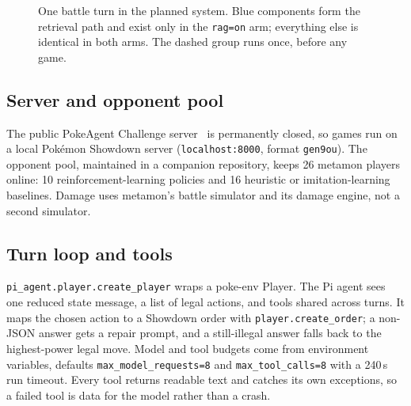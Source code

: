 \documentclass[11pt,a4paper]{article}
\newcommand{\code}[1]{\texttt{#1}}
\begin{document}
\begin{figure}[t]
\caption{One battle turn in the planned system. Blue components form the retrieval path and exist only in
the \code{rag=on} arm; everything else is identical in both arms. The dashed group runs once, before any game.}
\label{fig:arch}
\end{figure}

\subsection{Server and opponent pool}
The public PokeAgent Challenge server~\cite{challenge} is permanently closed, so games run on a local Pok\'emon Showdown server
(\code{localhost:8000}, format \code{gen9ou}). The opponent pool, maintained in a companion repository, keeps
26 metamon players online: 10 reinforcement-learning policies and 16 heuristic or imitation-learning baselines.
Damage uses metamon's battle simulator and its damage engine, not a second simulator.

\subsection{Turn loop and tools}
\code{pi\_agent.player.create\_player} wraps a poke-env Player. The Pi agent sees one reduced state message,
a list of legal actions, and tools shared across turns. It maps the chosen action to a Showdown order with
\code{player.create\_order}; a non-JSON answer gets a repair prompt, and a still-illegal answer falls back to
the highest-power legal move. Model and tool budgets come from environment variables, defaults
\code{max\_model\_requests=8} and \code{max\_tool\_calls=8} with a 240\,s run timeout.
Every tool returns readable text and catches its own exceptions, so a failed tool is data for the model
rather than a crash.
\end{document}
